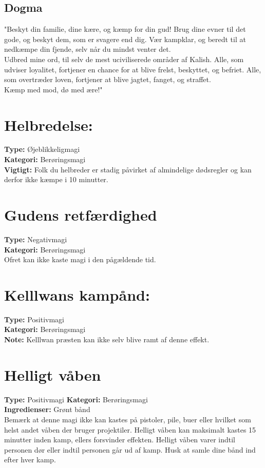 \subsection{Dogma}
"Beskyt din familie, dine kære, og kæmp for din gud! Brug dine evner til det gode, og beskyt dem, som er svagere end dig. Vær kampklar, og beredt til at nedkæmpe din fjende, selv når du mindst venter det.\\
Udbred mine ord, til selv de mest uciviliserede områder af Kalish. Alle, som udviser loyalitet, fortjener en chance for at blive frelst, beskyttet, og befriet. Alle, som overtræder loven, fortjener at blive jagtet, fanget, og straffet.\\
Kæmp med mod, dø med ære!"

\section{Helbredelse:}
\textbf{Type:} Øjeblikkeligmagi\\ 
\textbf{Kategori:} Berøringsmagi\\
\textbf{Vigtigt:} Folk du helbreder er stadig påvirket af almindelige dødsregler og kan derfor ikke kæmpe i 10 minutter.

\section{Gudens retfærdighed}
\textbf{Type:} Negativmagi\\ 
\textbf{Kategori:} Berøringsmagi\\
Ofret kan ikke kaste magi i den pågældende tid.

\section{Kelllwans kampånd:}
\textbf{Type:} Positivmagi\\ 
\textbf{Kategori:} Berøringsmagi\\
\textbf{Note:} Kelllwan præsten kan ikke selv blive ramt af denne effekt.

\section{Helligt våben}
\textbf{Type:} Positivmagi
\textbf{Kategori:} Berøringsmagi\\
\textbf{Ingredienser:} Grønt bånd\\
Bemærk at denne magi ikke kan kastes på pistoler, pile, buer eller hvilket som helst andet våben der bruger projektiler. Helligt våben kan maksimalt kastes 15 minutter inden kamp, ellers forsvinder effekten. Helligt våben varer indtil personen dør eller indtil personen går ud af kamp. Husk at samle
dine bånd ind efter hver kamp.\\

